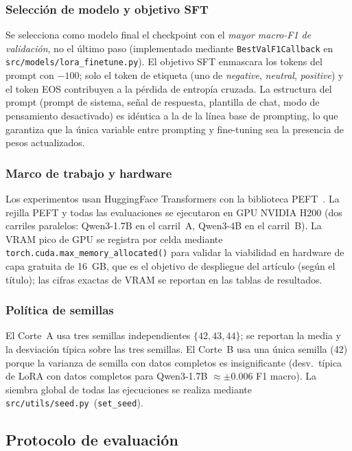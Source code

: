 \documentclass[conference]{IEEEtran}
\begin{document}
\subsubsection*{Selección de modelo y objetivo SFT}

Se selecciona como modelo final el checkpoint con el \emph{mayor macro-F1 de
validación}, no el último paso (implementado mediante
\texttt{BestValF1Callback} en \texttt{src/models/lora\_finetune.py}).
El objetivo SFT enmascara los tokens del prompt con $-100$; solo el token de
etiqueta (uno de \textit{negative}, \textit{neutral}, \textit{positive}) y el
token EOS contribuyen a la pérdida de entropía cruzada.
La estructura del prompt (prompt de sistema, señal de respuesta, plantilla de
chat, modo de pensamiento desactivado) es idéntica a la de la línea base de
prompting, lo que garantiza que la única variable entre prompting y fine-tuning
sea la presencia de pesos actualizados.

\subsubsection*{Marco de trabajo y hardware}

Los experimentos usan HuggingFace Transformers con la biblioteca
PEFT~\cite{mangrulkar2022peft}.
La rejilla PEFT y todas las evaluaciones se ejecutaron en GPU NVIDIA H200 (dos
carriles paralelos: Qwen3-1.7B en el carril~A, Qwen3-4B en el carril~B).
La VRAM pico de GPU se registra por celda mediante
\texttt{torch.cuda.max\_memory\_allocated()} para validar la viabilidad en
hardware de capa gratuita de 16~GB, que es el objetivo de despliegue del artículo
(según el título); las cifras exactas de VRAM se reportan en las tablas de
resultados.

\subsubsection*{Política de semillas}

El Corte~A usa tres semillas independientes $\{42, 43, 44\}$; se reportan la
media y la desviación típica sobre las tres semillas.
El Corte~B usa una única semilla (42) porque la varianza de semilla con datos
completos es insignificante (desv.\ típica de LoRA con datos completos para
Qwen3-1.7B $\approx \pm0.006$ F1 macro).
La siembra global de todas las ejecuciones se realiza mediante
\texttt{src/utils/seed.py}~(\texttt{set\_seed}).

\subsection{Protocolo de evaluación}
\label{sec:methodology_evaluation}
\end{document}

